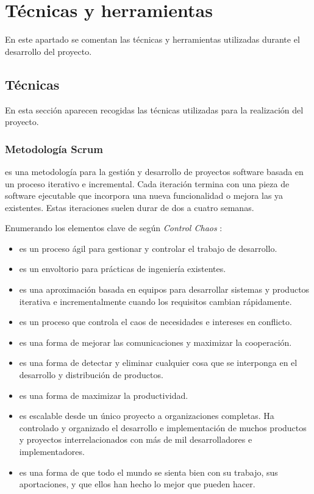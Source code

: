 \chapter{Técnicas y herramientas}

En este apartado se comentan las técnicas y herramientas utilizadas durante el desarrollo del proyecto.



\section{Técnicas}
En esta sección aparecen recogidas las técnicas utilizadas para la realización del proyecto.


\subsection{Metodología Scrum}
\scrum{} \cite{scrum} es una metodología para la gestión y desarrollo de proyectos software basada en un proceso iterativo e incremental. Cada iteración termina con una pieza de software ejecutable que incorpora una nueva funcionalidad o mejora las ya existentes. Estas iteraciones suelen durar de dos a cuatro semanas.

Enumerando los elementos clave de \scrum{} según \textit{Control Chaos} \cite{controlchaos}:
\begin{itemize}
 \item \scrum{} es un proceso ágil para gestionar y controlar el trabajo de desarrollo.
 \item \scrum{} es un envoltorio para prácticas de ingeniería existentes.
 \item \scrum{} es una aproximación basada en equipos para desarrollar sistemas y productos iterativa e incrementalmente cuando los requisitos cambian rápidamente.
 \item \scrum{} es un proceso que controla el caos de necesidades e intereses en conflicto.
 \item \scrum{} es una forma de mejorar las comunicaciones y maximizar la cooperación.
 \item \scrum{} es una forma de detectar y eliminar cualquier cosa que se interponga en el desarrollo y distribución de productos.
 \item \scrum{} es una forma de maximizar la productividad.
 \item \scrum{} es escalable desde un único proyecto a organizaciones completas. Ha controlado y organizado el desarrollo e implementación de muchos   productos y proyectos interrelacionados con más de mil desarrolladores e implementadores.
 \item \scrum{} es una forma de que todo el mundo se sienta bien con su trabajo, sus aportaciones, y que ellos han hecho lo mejor que pueden hacer.
\end{itemize}

